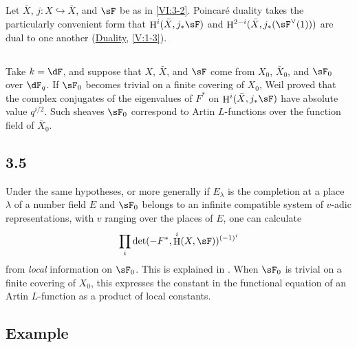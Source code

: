 \documentclass[12pt,oneside,english]{smfbook}
\DeclareMathOperator{\h}{H}
\begin{document}
\subsection{}\label{VI:3-3}

Let $\bar X$, $j:X\hookrightarrow\bar X$, and $\sF$ be as in \ref{VI:3-2}. Poincaré duality takes the particularly convenient form that $\h^i(\bar X,j_*\sF)$ and $\h^{2-i}(\bar X,j_*(\sF^\vee(1)))$ are dual to one another (\hyperref[V]{Duality}, \ref{V:1-3}).

\subsection{}\label{VI:3-4}

Take $k=\dF$, and suppose that $X$, $\bar X$, and $\sF$ come from $X_0$, $\bar X_0$, and $\sF_0$ over $\dF_q$. If $\sF_0$ becomes trivial on a finite covering of $X_0$, Weil proved that the complex conjugates of the eigenvalues of $F^\ast$ on $\h^i(\bar X,j_*\sF)$ have absolute value $q^{i/2}$. Such sheaves $\sF_0$ correspond to Artin $L$-functions over the function field of $\bar X_0$.

\subsection*{3.5}\label{VI:3-5_} %

Under the same hypotheses, or more generally if $E_\lambda$ is the completion at a place $\lambda$ of a number field $E$ and $\sF_0$ belongs to an infinite compatible system of $v$-adic representations, with $v$ ranging over the places of $E$, one can calculate
\[
  \prod_i \det(-F^\ast,\h^i(X,\sF))^{(-1)^i}
\]
from \emph{local} information on $\sF_0$. This is explained in \cite{de73}. When $\sF_0$ is trivial on a finite covering of $X_0$, this expresses the constant in the functional equation of an Artin $L$-function as a product of local constants.

\subsection{Example}\label{VI:3-5}
\end{document}
